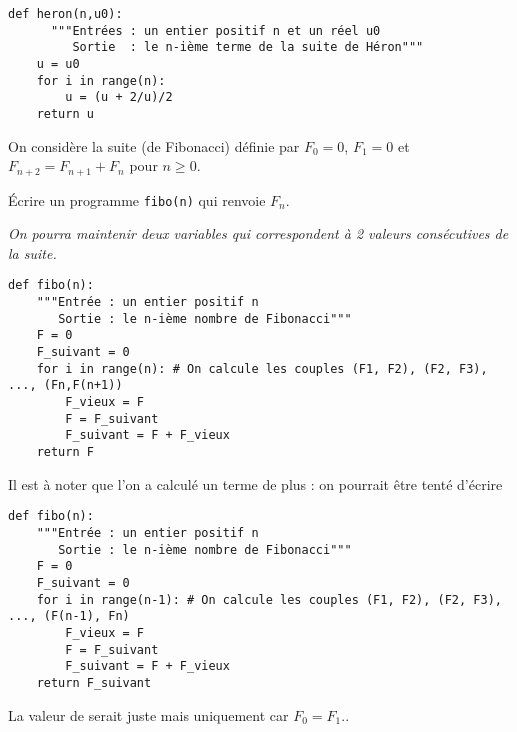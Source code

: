 \begin{Answer}
\begin{lstlisting}
def heron(n,u0):
	  """Entrées : un entier positif n et un réel u0
	     Sortie  : le n-ième terme de la suite de Héron"""
    u = u0
    for i in range(n):
        u = (u + 2/u)/2
    return u
\end{lstlisting}
\end{Answer}
\begin{Exercise}[title= Suite de Fibonacci : 1]
On considère la suite (de Fibonacci) définie par $F_{0}=0$, $F_1=0$ et $F_{n+2}=F_{n+1}+F_{n}$ pour $n\ge 0$.

Écrire un programme \texttt{fibo(n)} qui renvoie $F_n$.

{\it On pourra maintenir deux variables qui correspondent à 2 valeurs consécutives de la suite.}
\end{Exercise}
\begin{Answer}
\begin{lstlisting}
def fibo(n):
    """Entrée : un entier positif n
	   Sortie : le n-ième nombre de Fibonacci"""
    F = 0
    F_suivant = 0
    for i in range(n): # On calcule les couples (F1, F2), (F2, F3), ..., (Fn,F(n+1))
        F_vieux = F
        F = F_suivant
        F_suivant = F + F_vieux
    return F
\end{lstlisting}

Il est à noter que l'on a calculé un terme de plus : on pourrait être tenté d'écrire
\begin{lstlisting}
def fibo(n):
    """Entrée : un entier positif n
	   Sortie : le n-ième nombre de Fibonacci"""
    F = 0
    F_suivant = 0
    for i in range(n-1): # On calcule les couples (F1, F2), (F2, F3), ..., (F(n-1), Fn)
        F_vieux = F
        F = F_suivant
        F_suivant = F + F_vieux
    return F_suivant
\end{lstlisting}
La valeur de  serait juste mais uniquement car $F_0=F_1$..
\end{Answer}
